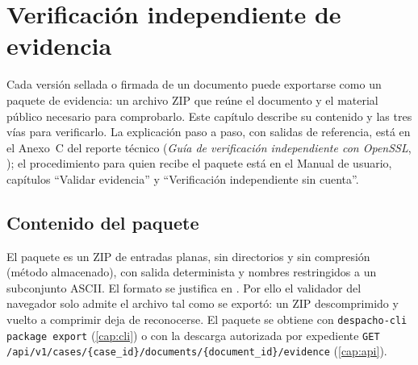 \chapter{Verificación independiente de evidencia}\label{cap:verificacion}

Cada versión sellada o firmada de un documento puede exportarse como un
paquete de evidencia: un archivo ZIP que reúne el documento y el material
público necesario para comprobarlo. Este capítulo describe su contenido y
las tres vías para verificarlo. La explicación paso a paso, con salidas de
referencia, está en el Anexo~C del reporte técnico (\emph{Guía de
verificación independiente con OpenSSL},
); el procedimiento para
quien recibe el paquete está en el Manual de usuario, capítulos
\enquote{Validar evidencia} y \enquote{Verificación independiente sin
cuenta}.


\section{Contenido del paquete}\label{sec:ver-contenido}

El paquete es un ZIP de entradas planas, sin directorios y sin compresión
(método almacenado), con salida determinista y nombres restringidos a un
subconjunto ASCII. El formato se justifica en
. Por ello el validador
del navegador solo admite el archivo tal como se exportó: un ZIP
descomprimido y vuelto a comprimir deja de reconocerse. El paquete se
obtiene con \texttt{despacho-cli package export} (\cref{cap:cli}) o con la
descarga autorizada por expediente
\texttt{GET /api/v1/cases/\{case\_id\}/documents/\{document\_id\}/evidence}
(\cref{cap:api}).

